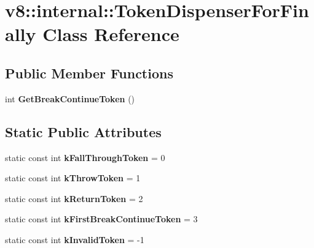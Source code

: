 \hypertarget{classv8_1_1internal_1_1_token_dispenser_for_finally}{}\section{v8\+:\+:internal\+:\+:Token\+Dispenser\+For\+Finally Class Reference}
\label{classv8_1_1internal_1_1_token_dispenser_for_finally}
\subsection*{Public Member Functions}
\begin{DoxyCompactItemize}
\item 
int {\bfseries Get\+Break\+Continue\+Token} ()\hypertarget{classv8_1_1internal_1_1_token_dispenser_for_finally_a9cc2e63644d59b4a8b0c9d78f588caa6}{}\label{classv8_1_1internal_1_1_token_dispenser_for_finally_a9cc2e63644d59b4a8b0c9d78f588caa6}

\end{DoxyCompactItemize}
\subsection*{Static Public Attributes}
\begin{DoxyCompactItemize}
\item 
static const int {\bfseries k\+Fall\+Through\+Token} = 0\hypertarget{classv8_1_1internal_1_1_token_dispenser_for_finally_a8ce4dd61c5a1e985ec535e3f60480502}{}\label{classv8_1_1internal_1_1_token_dispenser_for_finally_a8ce4dd61c5a1e985ec535e3f60480502}

\item 
static const int {\bfseries k\+Throw\+Token} = 1\hypertarget{classv8_1_1internal_1_1_token_dispenser_for_finally_af9ce00aa4f71d842bac93e7d25e3d4bc}{}\label{classv8_1_1internal_1_1_token_dispenser_for_finally_af9ce00aa4f71d842bac93e7d25e3d4bc}

\item 
static const int {\bfseries k\+Return\+Token} = 2\hypertarget{classv8_1_1internal_1_1_token_dispenser_for_finally_a91a3b09a576d5e1d33009c2348d53ebc}{}\label{classv8_1_1internal_1_1_token_dispenser_for_finally_a91a3b09a576d5e1d33009c2348d53ebc}

\item 
static const int {\bfseries k\+First\+Break\+Continue\+Token} = 3\hypertarget{classv8_1_1internal_1_1_token_dispenser_for_finally_a9e25676fafb9e939ca43a5c718c9d61f}{}\label{classv8_1_1internal_1_1_token_dispenser_for_finally_a9e25676fafb9e939ca43a5c718c9d61f}

\item 
static const int {\bfseries k\+Invalid\+Token} = -\/1\hypertarget{classv8_1_1internal_1_1_token_dispenser_for_finally_ad21a7a3861e100b46e420d76c0924380}{}\label{classv8_1_1internal_1_1_token_dispenser_for_finally_ad21a7a3861e100b46e420d76c0924380}

\end{DoxyCompactItemize}
